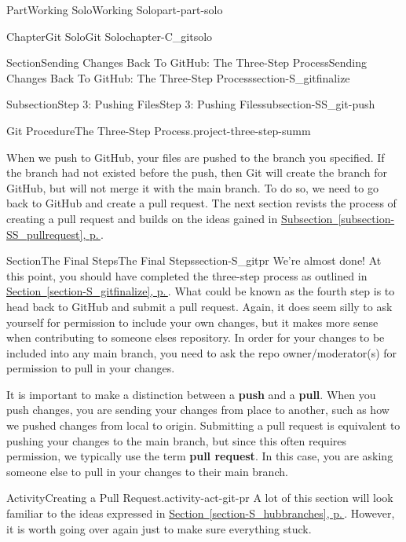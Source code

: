 \documentclass[twoside,10pt,]{book}
\newcommand{\xreffont}{\relax}
\newcommand{\terminology}[1]{\textbf{#1}}
\begin{document}
\begin{partptx}{Part}{Working Solo}{}{Working Solo}{}{}{part-part-solo}
\begin{chapterptx}{Chapter}{Git Solo}{}{Git Solo}{}{}{chapter-C_gitsolo}
\begin{sectionptx}{Section}{Sending Changes Back To GitHub: The Three-Step Process}{}{Sending Changes Back To GitHub: The Three-Step Process}{}{}{section-S_gitfinalize}
\begin{subsectionptx}{Subsection}{Step 3: Pushing Files}{}{Step 3: Pushing Files}{}{}{subsection-SS_git-push}
\begin{project}{Git Procedure}{The Three-Step Process.}{project-three-step-summ}
%
\end{project}%
\end{subsectionptx}
\begin{conclusion}{}%
When we push to GitHub, your files are pushed to the branch you specified. If the branch had not existed before the push, then Git will create the branch for GitHub, but will not merge it with the main branch. To do so, we need to go back to GitHub and create a pull request. The next section revists the process of creating a pull request and builds on the ideas gained in \hyperref[subsection-SS_pullrequest]{Subsection~{\xreffont\ref{subsection-SS_pullrequest}}, p.\,\pageref{subsection-SS_pullrequest}}.%
\end{conclusion}%
\end{sectionptx}
%
%
\typeout{************************************************}
\typeout{************************************************}
%
\begin{sectionptx}{Section}{The Final Steps}{}{The Final Steps}{}{}{section-S_gitpr}
%
%
%
We're almost done! At this point, you should have completed the three-step process as outlined in \hyperref[section-S_gitfinalize]{Section~{\xreffont\ref{section-S_gitfinalize}}, p.\,\pageref{section-S_gitfinalize}}. What could be known as the fourth step is to head back to GitHub and submit a pull request. Again, it does seem silly to ask yourself for permission to include your own changes, but it makes more sense when contributing to someone elses repository. In order for your changes to be included into any main branch, you need to ask the repo owner\slash{}moderator(s) for permission to pull in your changes.%
\par
It is important to make a distinction between a \terminology{push} and a \terminology{pull}. When you push changes, you are sending your changes from place to another, such as how we pushed changes from local to origin. Submitting a pull request is equivalent to pushing your changes to the main branch, but since this often requires permission, we typically use the term \terminology{pull request}. In this case, you are asking someone else to pull in your changes to their main branch.%
\begin{activity}{Activity}{Creating a Pull Request.}{activity-act-git-pr}%
%
A lot of this section will look familiar to the ideas expressed in \hyperref[section-S_hubbranches]{Section~{\xreffont\ref{section-S_hubbranches}}, p.\,\pageref{section-S_hubbranches}}. However, it is worth going over again just to make sure everything stuck.%

\end{activity}
\end{sectionptx}
\end{chapterptx}
\end{partptx}
\end{document}
